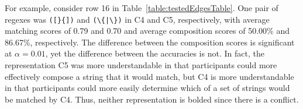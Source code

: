 For example, consider row 16 in Table~\ref{table:testedEdgesTable}.
One pair of regexes was \verb!([}{])! and \verb!(\{|\})! in C4 and C5, respectively, with average matching scores of 0.79  and 0.70 and average composition scores of 50.00\%  and 86.67\%, respectively.
The difference between the composition scores is significant at $\alpha = 0.01$, yet the difference between the accuracies is not. 
In fact, the representation C5 was more understandable in that participants could more effectively compose a string that it would match, but C4 is more understandable in that participants could more easily determine which of a set of strings would be matched by C4. Thus, neither representation is bolded since there is a conflict. 


%

%
%
%
%
%



 
